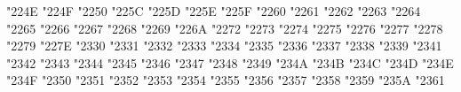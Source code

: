 {\Uchar\jis"224E %
\Uchar\jis"224F %
\Uchar\jis"2250 %
\Uchar\jis"225C %
\Uchar\jis"225D %
\Uchar\jis"225E %
\Uchar\jis"225F %
\Uchar\jis"2260 %
\Uchar\jis"2261 %
\Uchar\jis"2262 %
\Uchar\jis"2263 %
\Uchar\jis"2264 %
\Uchar\jis"2265 %
\Uchar\jis"2266 %
\Uchar\jis"2267 %
\Uchar\jis"2268 %
\Uchar\jis"2269 %
\Uchar\jis"226A %
\Uchar\jis"2272 %
\Uchar\jis"2273 %
\Uchar\jis"2274 %
\Uchar\jis"2275 %
\Uchar\jis"2276 %
\Uchar\jis"2277 %
\Uchar\jis"2278 %
\Uchar\jis"2279 %
\Uchar\jis"227E %
\Uchar\jis"2330 %
\Uchar\jis"2331 %
\Uchar\jis"2332 %
\Uchar\jis"2333 %
\Uchar\jis"2334 %
\Uchar\jis"2335 %
\Uchar\jis"2336 %
\Uchar\jis"2337 %
\Uchar\jis"2338 %
\Uchar\jis"2339 %
\Uchar\jis"2341 %
\Uchar\jis"2342 %
\Uchar\jis"2343 %
\Uchar\jis"2344 %
\Uchar\jis"2345 %
\Uchar\jis"2346 %
\Uchar\jis"2347 %
\Uchar\jis"2348 %
\Uchar\jis"2349 %
\Uchar\jis"234A %
\Uchar\jis"234B %
\Uchar\jis"234C %
\Uchar\jis"234D %
\Uchar\jis"234E %
\Uchar\jis"234F %
\Uchar\jis"2350 %
\Uchar\jis"2351 %
\Uchar\jis"2352 %
\Uchar\jis"2353 %
\Uchar\jis"2354 %
\Uchar\jis"2355 %
\Uchar\jis"2356 %
\Uchar\jis"2357 %
\Uchar\jis"2358 %
\Uchar\jis"2359 %
\Uchar\jis"235A %
\Uchar\jis"2361 %
}
